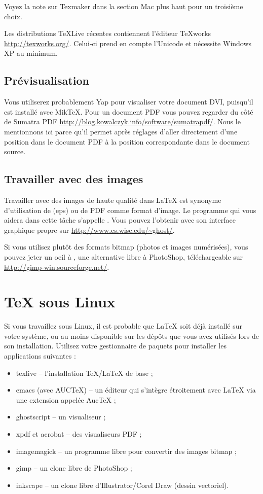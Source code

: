 Voyez la note sur Texmaker dans la section Mac plus haut pour un
troisième choix.

Les distributions \TeX Live récentes contiennent l'éditeur \TeX{}works
\url{http://texworks.org/}. Celui-ci prend en compte l'Unicode et
nécessite Windows XP au minimum.

\subsection{Prévisualisation}

Vous utiliserez probablement Yap pour visualiser votre document DVI,
puisqu'il est installé avec MikTeX. Pour un document PDF vous pouvez
regarder du côté de Sumatra PDF
\url{http://blog.kowalczyk.info/software/sumatrapdf/}. Nous le mentionnons
ici parce qu'il permet après réglages d'aller directement d'une
position dans le document PDF à la position correspondante dans le
document source.

\subsection{Travailler avec des images}

Travailler avec des images de haute qualité dans \LaTeX{} est synonyme
d'utilisation de \EPSi{} (eps) ou de PDF comme format d'image. Le
programme qui vous aidera dans cette tâche s'appelle
. Vous pouvez l'obtenir avec son interface
graphique propre  sur \url{http://www.cs.wisc.edu/~ghost/}.

Si vous utilisez plutôt des formats bitmap (photos et images
numérisées), vous pouvez jeter un oeil à , une alternative
libre à PhotoShop, téléchargeable sur
\url{http://gimp-win.sourceforge.net/}.

\section{\TeX{} sous Linux}

Si vous travaillez sous Linux, il est probable que \LaTeX{} soit déjà
installé sur votre système, ou au moins disponible sur les dépôts que
vous avez utilisés lors de son installation. Utilisez votre
gestionnaire de paquets pour installer les applications suivantes :

\begin{itemize}
\item texlive -- l'installation \TeX{}/\LaTeX{} de base ;
\item emacs (avec AUCTeX) -- un éditeur qui s'intègre
  étroitement avec \LaTeX{} via une extension appelée AucTeX ;
\item ghostscript -- un visualiseur \PSi{} ;
\item xpdf et acrobat -- des visualiseurs PDF ;
\item imagemagick -- un programme libre pour convertir des images
  bitmap ;
\item gimp -- un clone libre de PhotoShop ;
\item inkscape -- un clone libre d'Illustrator/Corel Draw (dessin
  vectoriel).
\end{itemize}

